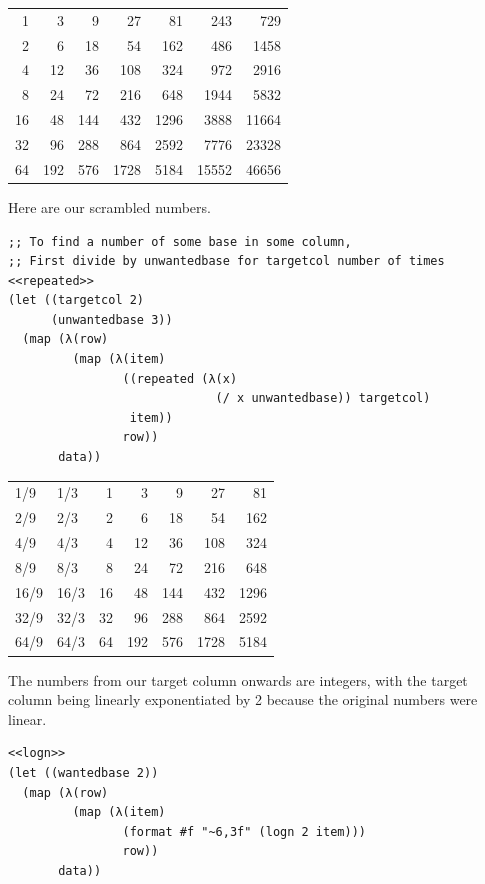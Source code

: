 \documentclass[final,fleqn,titlepage]{article}
\begin{document}
\begin{center}
\begin{tabular}{rrrrrrr}
1 & 3 & 9 & 27 & 81 & 243 & 729\\
2 & 6 & 18 & 54 & 162 & 486 & 1458\\
4 & 12 & 36 & 108 & 324 & 972 & 2916\\
8 & 24 & 72 & 216 & 648 & 1944 & 5832\\
16 & 48 & 144 & 432 & 1296 & 3888 & 11664\\
32 & 96 & 288 & 864 & 2592 & 7776 & 23328\\
64 & 192 & 576 & 1728 & 5184 & 15552 & 46656\\
\end{tabular}
\end{center}

Here are our scrambled numbers. 

\begin{verbatim}
;; To find a number of some base in some column,
;; First divide by unwantedbase for targetcol number of times
<<repeated>>
(let ((targetcol 2)
      (unwantedbase 3))
  (map (λ(row)
         (map (λ(item)
                ((repeated (λ(x) 
                             (/ x unwantedbase)) targetcol)
                 item))
                row))
       data))
\end{verbatim}

\begin{center}
\begin{tabular}{llrrrrr}
1/9 & 1/3 & 1 & 3 & 9 & 27 & 81\\
2/9 & 2/3 & 2 & 6 & 18 & 54 & 162\\
4/9 & 4/3 & 4 & 12 & 36 & 108 & 324\\
8/9 & 8/3 & 8 & 24 & 72 & 216 & 648\\
16/9 & 16/3 & 16 & 48 & 144 & 432 & 1296\\
32/9 & 32/3 & 32 & 96 & 288 & 864 & 2592\\
64/9 & 64/3 & 64 & 192 & 576 & 1728 & 5184\\
\end{tabular}
\end{center}

The numbers from our target column onwards are integers, with the target column
being linearly exponentiated by 2 because the original numbers were linear.

\begin{verbatim}
<<logn>>
(let ((wantedbase 2))
  (map (λ(row)
         (map (λ(item)
                (format #f "~6,3f" (logn 2 item)))
                row))
       data))
\end{verbatim}
\end{document}
